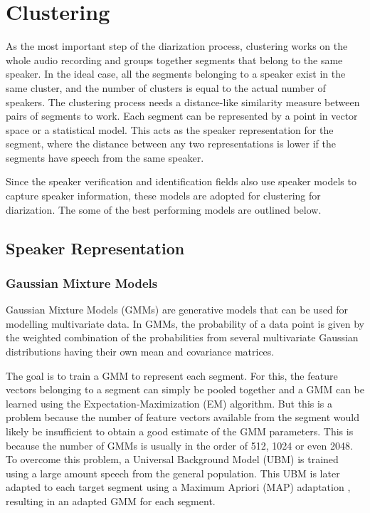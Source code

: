 \section{Clustering}
	As the most important step of the diarization process, clustering works on the whole audio recording and groups together segments that belong to the same speaker. In the ideal case, all the segments belonging to a speaker exist in the same cluster, and the number of clusters is equal to the actual number of speakers. The clustering process needs a distance-like similarity measure between pairs of segments to work. Each segment can be represented by a point in vector space or a statistical model. This acts as the speaker representation for the segment, where the distance between any two representations is lower if the segments have speech from the same speaker.
	
	Since the speaker verification and identification fields also use speaker models to capture speaker information, these models are adopted for clustering for diarization. The some of the best performing models are outlined below.
	
	\subsection{Speaker Representation}
		\subsubsection{Gaussian Mixture Models}
		Gaussian Mixture Models (GMMs) are generative models that can be used for modelling multivariate data. In GMMs, the probability of a data point is given by the weighted combination of the probabilities from several multivariate Gaussian distributions having their own mean and covariance matrices.
		
		The goal is to train a GMM to represent each segment. For this, the feature vectors belonging to a segment can simply be pooled together and a GMM can be learned using the Expectation-Maximization (EM) \cite{moon1996expectation} algorithm. But this is a problem because the number of feature vectors available from the segment would likely be insufficient to obtain a good estimate of the GMM parameters. This is because the number of GMMs is usually in the order of 512, 1024 or even 2048. To overcome this problem, a Universal Background Model (UBM) is trained using a large amount speech from the general population. This UBM is later adapted to each target segment using a Maximum Apriori (MAP) adaptation \cite{Reynolds:2000:SVU:2774258.2774423}, resulting in an adapted GMM for each segment.
		
